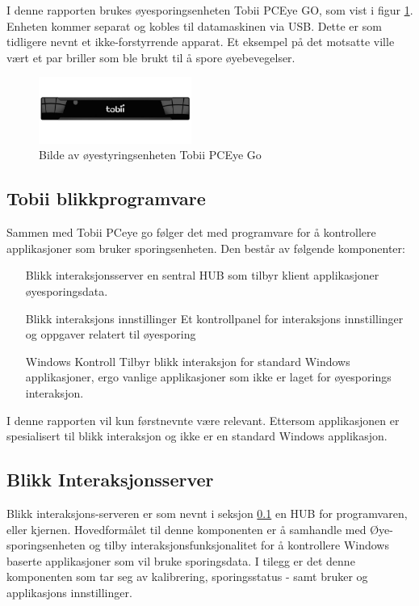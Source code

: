 \documentclass[phd,tocprelim]{cornell}
\begin{document}
I denne rapporten brukes øyesporingsenheten Tobii PCEye GO, som vist i figur \ref{fig:tobiiPc}. Enheten kommer separat og kobles til datamaskinen via USB. Dette er som tidligere nevnt et ikke-forstyrrende apparat. Et eksempel på det motsatte ville vært et par briller som ble brukt til å spore øyebevegelser. 



\begin{figure}[ht!]
\centering
\includegraphics[width=50mm]{TobiiEyeGo}
\caption{Bilde av øyestyringsenheten Tobii PCEye Go}
\label{fig:tobiiPc}
\end{figure}


\subsection{Tobii blikkprogramvare}
\label{subsec:blikk}

Sammen med Tobii PCeye go følger det med programvare for å kontrollere applikasjoner som bruker sporingsenheten. Den består av følgende komponenter: 

\begin{itemize}
\item [Blikk interaksjonsserver] en sentral HUB som tilbyr klient applikasjoner øyesporingsdata. 
\item [Blikk interaksjons innstillinger] Et kontrollpanel for interaksjons innstillinger og oppgaver relatert til øyesporing
\item [Windows Kontroll] Tilbyr blikk interaksjon for standard Windows applikasjoner, ergo vanlige applikasjoner som ikke er laget for øyesporings interaksjon.
\end{itemize}

I denne rapporten vil kun førstnevnte være relevant. Ettersom applikasjonen er spesialisert til blikk interaksjon og ikke er en standard Windows applikasjon.

\subsection{Blikk Interaksjonsserver}

Blikk interaksjons-serveren er som nevnt i seksjon \ref{subsec:blikk} en HUB for programvaren, eller kjernen. Hovedformålet til denne komponenten er å samhandle med Øye-sporingsenheten og tilby interaksjonsfunksjonalitet for å kontrollere Windows baserte applikasjoner som vil bruke sporingsdata. I tilegg er det denne komponenten som tar seg av kalibrering, sporingsstatus - samt bruker og applikasjons innstillinger.
\end{document}
